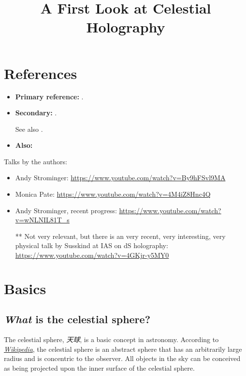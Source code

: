 \documentclass[a4paper
	,10pt
]{article}
\title{A First Look at Celestial Holography}
\begin{document}
\maketitle
{}
\thispagestyle{empty}


\setlength{\parskip}{.1\baselineskip}
\tableofcontents
\setlength{\parskip}{\parskipnorm}

\addtocounter{section}{-1}
\section{References}
	\begin{itemize}
	\item \textbf{Primary reference:} . 
	\item \textbf{Secondary:} . 
	
	See also . 
	\item \textbf{Also:} 
	\end{itemize}
	
	\noindent
	Talks by the authors:
	\begin{itemize}[noitemsep]
	\item Andy Strominger: \url{https://www.youtube.com/watch?v=By9hFSvl9MA}
	\item Monica Pate: \url{https://www.youtube.com/watch?v=4M4iZ8Hnc4Q}
	\item Andy Strominger, recent progress: \url{https://www.youtube.com/watch?v=wNLNIL81T_s}
	
	\vspace{.5\baselineskip}
	
	\item[**] Not very relevant, but there is an very recent, very interesting, very physical talk by Susskind at IAS on dS holography: \url{https://www.youtube.com/watch?v=4GKjr-y5MY0}
	\end{itemize}

\pagebreak

\section{Basics}
\subsection{\textsl{What} is the celestial sphere?}
	The celestial sphere, \textit{天球}, is a basic concept in astronomy. According to \href{https://en.wikipedia.org/wiki/Celestial_sphere}{\textsl{Wikipedia}}, the celestial sphere is an abstract sphere that has an arbitrarily large radius and is concentric to the observer. All objects in the sky can be conceived as being projected upon the inner surface of the celestial sphere. 
	
\end{document}
